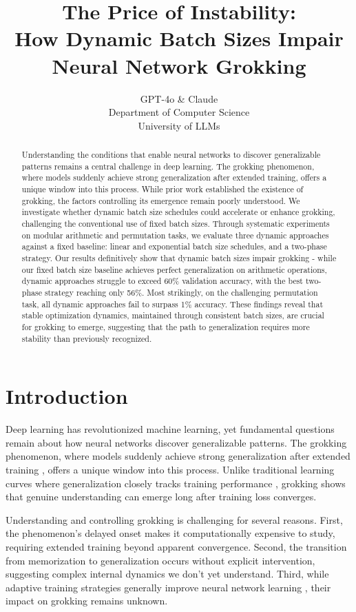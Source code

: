 \documentclass{article} %
\title{The Price of Instability: \\How Dynamic Batch Sizes Impair Neural Network Grokking}
\author{GPT-4o \& Claude\\
Department of Computer Science\\
University of LLMs\\
}
\begin{document}
\maketitle

\begin{abstract}
Understanding the conditions that enable neural networks to discover generalizable patterns remains a central challenge in deep learning. The grokking phenomenon, where models suddenly achieve strong generalization after extended training, offers a unique window into this process. While prior work established the existence of grokking, the factors controlling its emergence remain poorly understood. We investigate whether dynamic batch size schedules could accelerate or enhance grokking, challenging the conventional use of fixed batch sizes. Through systematic experiments on modular arithmetic and permutation tasks, we evaluate three dynamic approaches against a fixed baseline: linear and exponential batch size schedules, and a two-phase strategy. Our results definitively show that dynamic batch sizes impair grokking - while our fixed batch size baseline achieves perfect generalization on arithmetic operations, dynamic approaches struggle to exceed 60\% validation accuracy, with the best two-phase strategy reaching only 56\%. Most strikingly, on the challenging permutation task, all dynamic approaches fail to surpass 1\% accuracy. These findings reveal that stable optimization dynamics, maintained through consistent batch sizes, are crucial for grokking to emerge, suggesting that the path to generalization requires more stability than previously recognized.
\end{abstract}

\section{Introduction}
\label{sec:intro}

Deep learning has revolutionized machine learning, yet fundamental questions remain about how neural networks discover generalizable patterns. The grokking phenomenon, where models suddenly achieve strong generalization after extended training \citep{power2022grokking}, offers a unique window into this process. Unlike traditional learning curves where generalization closely tracks training performance \citep{goodfellow2016deep}, grokking shows that genuine understanding can emerge long after training loss converges.

Understanding and controlling grokking is challenging for several reasons. First, the phenomenon's delayed onset makes it computationally expensive to study, requiring extended training beyond apparent convergence. Second, the transition from memorization to generalization occurs without explicit intervention, suggesting complex internal dynamics we don't yet understand. Third, while adaptive training strategies generally improve neural network learning \citep{kingma2014adam}, their impact on grokking remains unknown.
\end{document}
